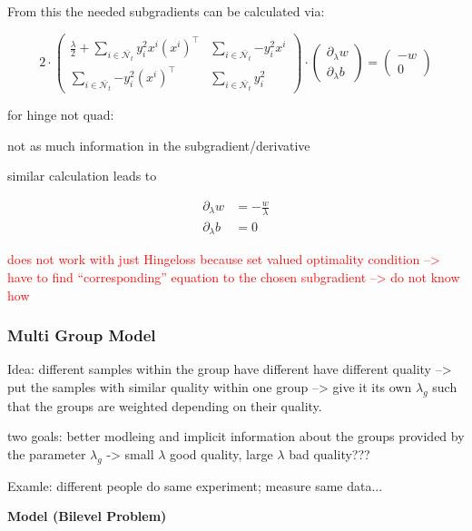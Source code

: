 From this the needed subgradients can be calculated via:

\begin{equation}
	2\cdot\begin{pmatrix} \frac{\lambda}{2}+\sum_{i \in \bar{\mathcal{N}_t}}{y_i^2x^i(x^i)^{\top}} & \sum_{i \in \bar{\mathcal{N}_t}}	{-y_i^2x^i} \\ \sum_{i \in \bar{\mathcal{N}_t}}{-y_i^2(x^i)^{\top}} & \sum_{i \in \bar{\mathcal{N}_t}}{y_i^2}\end{pmatrix}
	\cdot \begin{pmatrix} \partial_{\lambda}w \\ \partial_{\lambda}b\end{pmatrix}
	= \begin{pmatrix}-w \\ 0\end{pmatrix}
\label{subgr_wb}
\end{equation}

for hinge not quad:

not as much information in the subgradient/derivative

similar calculation leads to 

\begin{align}
	\partial_{\lambda}w &= -\frac{w}{\lambda} \\
	\partial_{\lambda}b &= 0
\end{align}

\textcolor{red}{does not work with just Hingeloss because set valued optimality condition --> have to find ``corresponding'' equation to the chosen subgradient --> do not know how}

\subsubsection{Multi Group Model}

Idea: different samples within the group have different have different quality --> put the samples with similar quality within one group --> give it its own \(\lambda_g\) such that the groups are weighted depending on their quality.

two goals: better modleing and implicit information about the groups provided by the parameter \(\lambda_g\) -> small \(\lambda\) good quality, large \(\lambda\) bad quality???

Examle: different people do same experiment; measure same data...

\textbf{Model (Bilevel Problem)}

